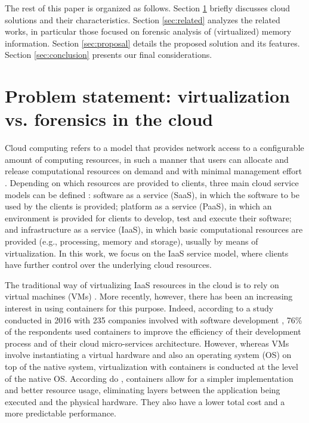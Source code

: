 \documentclass[10pt,journal,compsoc]{IEEEtran}
\begin{document}
The rest of this paper is organized as follows.
%
Section \ref{sec:cloud} briefly discusses cloud solutions and their characteristics.
%
Section \ref{sec:related} analyzes the related works, in particular those focused on forensic analysis of (virtualized) memory information.
%
Section \ref{sec:proposal} details the proposed solution and its features.
%
Section \ref{sec:conclusion} presents our final considerations.



\section{Problem statement: virtualization vs. forensics in the cloud}
\label{sec:cloud}


Cloud computing refers to a model that provides network access to a configurable amount of computing resources, in such a manner that users can allocate and release computational resources on demand and with minimal management effort \cite{NIST2011}.
%
Depending on which resources are provided to clients, three main cloud service models can be defined \cite{NIST2011}: software as a service (SaaS), in which the software to be used by the clients is provided; platform as a service (PaaS), in which an environment is provided for clients to develop, test and execute their software; and infrastructure as a service (IaaS), in which basic computational resources are provided (e.g., processing, memory and storage), usually by means of virtualization.
%
In this work, we focus on the IaaS service model, where clients have further control over the underlying cloud resources.


The traditional way of virtualizing IaaS resources in the cloud is to rely on virtual machines (VMs) \cite{Diamanti:2018}.
%
More recently, however, there has been an increasing interest in using containers for this purpose.
%
Indeed, according to a study conducted in 2016 with 235 companies involved with software development \cite{container-survey:2016}, 76\% of the respondents used containers to improve the efficiency of their development process and of their cloud micro-services architecture.
%
However, whereas VMs involve instantiating a virtual hardware and also an operating system (OS) on top of the native system, virtualization with containers is conducted at the level of the native OS.
%
According do \cite{Diamanti:2018}, containers allow for a simpler implementation and better resource usage, eliminating layers between the application being executed and the physical hardware.
%
They also have a lower total cost and a more predictable performance.
\end{document}
